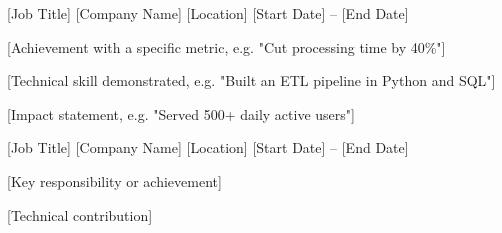 

\begin{cventries}

  \cventry
    {[Job Title]} %
    {[Company Name]} %
    {[Location]} %
    {[Start Date] -- [End Date]} %
    {
      \begin{cvitems}
        \item {[Achievement with a specific metric, e.g. "Cut processing time by 40\%"]}
        \item {[Technical skill demonstrated, e.g. "Built an ETL pipeline in Python and SQL"]}
        \item {[Impact statement, e.g. "Served 500+ daily active users"]}
      \end{cvitems}
    }

  \cventry
    {[Job Title]} %
    {[Company Name]} %
    {[Location]} %
    {[Start Date] -- [End Date]} %
    {
      \begin{cvitems}
        \item {[Key responsibility or achievement]}
        \item {[Technical contribution]}
      \end{cvitems}
    }

\end{cventries}
